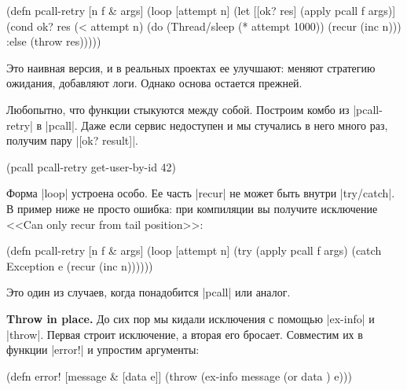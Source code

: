 \begin{english}
  \begin{clojure}
(defn pcall-retry [n f & args]
  (loop [attempt n]
    (let [[ok? res] (apply pcall f args)]
      (cond
        ok? res
        (< attempt n)
        (do
          (Thread/sleep (* attempt 1000))
          (recur (inc n)))
        :else
        (throw res)))))
  \end{clojure}
\end{english}

Это наивная версия, и в реальных проектах ее улучшают: меняют стратегию
ожидания, добавляют логи. Однако основа остается прежней.

Любопытно, что функции стыкуются между собой. Построим комбо из
\spverb|pcall-retry| в \spverb|pcall|. Даже если сервис недоступен и мы
стучались в него много раз, получим пару \spverb|[ok? result]|.

\begin{english}
  \begin{clojure}
(pcall pcall-retry get-user-by-id 42)
  \end{clojure}
\end{english}

Форма \spverb|loop| устроена особо. Ее часть \spverb|recur| не может быть внутри
\spverb|try/catch|. В пример ниже не просто ошибка: при компиляции вы получите
исключение <<Can only recur from tail position>>:

\begin{english}
  \begin{clojure}
(defn pcall-retry [n f & args]
  (loop [attempt n]
    (try
      (apply pcall f args)
      (catch Exception e
        (recur (inc n))))))
  \end{clojure}
\end{english}

Это один из случаев, когда понадобится \spverb|pcall| или аналог.

\textbf{Throw in place.} До сих пор мы кидали исключения с помощью
\spverb|ex-info| и \spverb|throw|. Первая строит исключение, а вторая его
бросает. Совместим их в функции \spverb|error!| и упростим аргументы:

\begin{english}
  \begin{clojure}
(defn error! [message & [data e]]
  (throw (ex-info message (or data {}) e)))
  \end{clojure}
\end{english}

